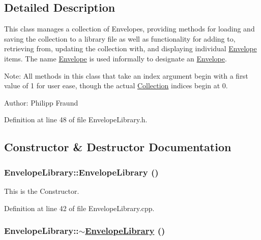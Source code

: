 \subsection{Detailed Description}
This class manages a collection of Envelopes, providing methods for loading and saving the collection to a library file as well as functionality for adding to, retrieving from, updating the collection with, and displaying individual \hyperlink{classEnvelope}{Envelope} items. The name \hyperlink{classEnvelope}{Envelope} is used informally to designate an \hyperlink{classEnvelope}{Envelope}.

\begin{Desc}
\item[Note:]All methods in this class that take an index argument begin with a first value of 1 for user ease, though the actual \hyperlink{classCollection}{Collection} indices begin at 0.\end{Desc}
\begin{Desc}
\item[Author:]Philipp Fraund \end{Desc}




Definition at line 48 of file Envelope\-Library.h.

\subsection{Constructor \& Destructor Documentation}
\hypertarget{classEnvelopeLibrary_a0}{
\subsubsection[EnvelopeLibrary]{\setlength{\rightskip}{0pt plus 5cm}Envelope\-Library::Envelope\-Library ()}}
\label{classEnvelopeLibrary_a0}


This is the Constructor. 

Definition at line 42 of file Envelope\-Library.cpp.\hypertarget{classEnvelopeLibrary_a1}{
\subsubsection[$\sim$EnvelopeLibrary]{\setlength{\rightskip}{0pt plus 5cm}Envelope\-Library::$\sim$\hyperlink{classEnvelopeLibrary}{Envelope\-Library} ()}}
\label{classEnvelopeLibrary_a1}


